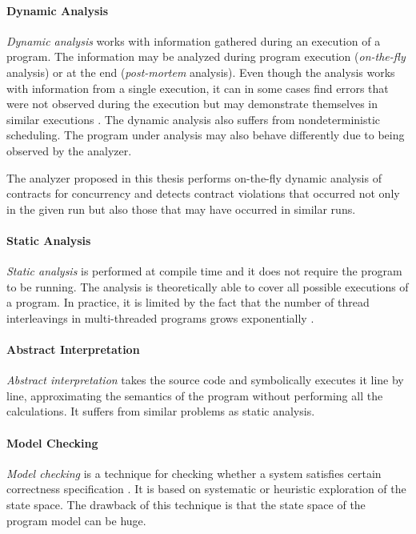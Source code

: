 \paragraph{Dynamic Analysis}
\emph{Dynamic analysis} works with information gathered during an execution of a
program. The information may be analyzed during program execution
(\emph{on-the-fly} analysis) or at the end (\emph{post-mortem} analysis). Even
though the analysis works with information from a single execution, it can in
some cases find errors that were not observed during the execution but may
demonstrate themselves in similar executions \cite{letko}. The dynamic analysis
also suffers from nondeterministic scheduling. The program under analysis may
also behave differently due to being observed by the analyzer.

The analyzer proposed in this thesis performs on-the-fly dynamic analysis of
contracts for concurrency and detects contract violations that occurred not only
in the given run but also those that may have occurred in similar runs.

\paragraph{Static Analysis}
\emph{Static analysis} is performed at compile time and it does not require the
program to be running. The analysis is theoretically able to cover all possible
executions of a program. In practice, it is limited by the fact that the number
of thread interleavings in multi-threaded programs grows exponentially
\cite{letko}.

\paragraph{Abstract Interpretation}
\emph{Abstract interpretation} takes the source code and symbolically executes
it line by line, approximating the semantics of the program without performing
all the calculations. It suffers from similar problems as static analysis.

\paragraph{Model Checking}
\emph{Model checking} is a technique for checking whether a system satisfies
certain correctness specification \cite{letko}. It is based on systematic or
heuristic exploration of the state space. The drawback of this technique is that
the state space of the program model can be huge.

